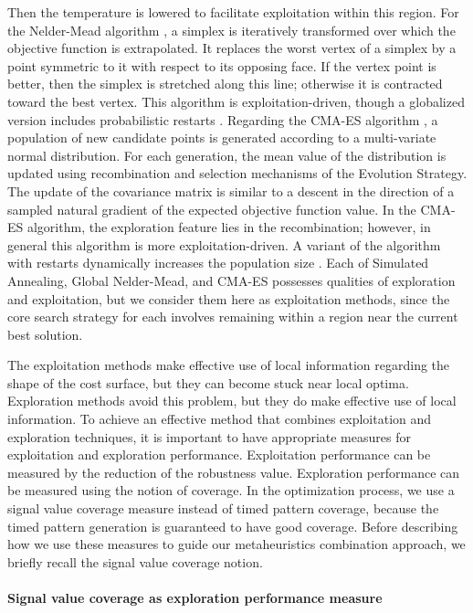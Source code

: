 Then the temperature is lowered to facilitate exploitation within this region. For the Nelder-Mead algorithm \cite{NelderMead65}, a simplex is iteratively transformed over which the objective function is extrapolated. It replaces the worst vertex of a simplex by a point symmetric to it with respect to its opposing face. If the vertex point is better, then the simplex is stretched along this line; otherwise it is contracted toward the best vertex. This algorithm is exploitation-driven, though a globalized version includes probabilistic restarts \cite{CHANG2012684}. Regarding the CMA-ES algorithm \cite{hansen2006eda}, a population of new candidate points is generated according to a multi-variate normal distribution. For each generation, the mean value of the distribution is updated using recombination and selection mechanisms of the Evolution Strategy. The update of the covariance matrix is similar to a descent in the direction of a sampled natural gradient of the expected objective function value. In the CMA-ES algorithm, the exploration feature lies in the recombination; however, in general this algorithm is more exploitation-driven. A variant of the algorithm with restarts dynamically increases the population size \cite{hansen2006eda}. Each of Simulated Annealing, Global Nelder-Mead, and CMA-ES possesses qualities of exploration and exploitation, but we consider them here as exploitation methods, since the core search strategy for each involves remaining within a region near the current best solution.

The exploitation methods make effective use of local information regarding the shape of the cost surface, but they can become stuck near local optima. Exploration methods avoid this problem, but they do make effective use of local information. To achieve an effective method that combines exploitation and exploration techniques, it is important to have appropriate measures for exploitation and exploration performance. Exploitation performance can be measured by the reduction of the robustness value. Exploration performance can be measured using the notion of coverage. In the optimization process, we use a signal value coverage measure instead of timed pattern coverage, because the timed pattern generation is guaranteed to have good coverage. Before describing how we use these measures to guide our metaheuristics combination approach, we briefly recall the signal value coverage notion.

\paragraph{Signal value coverage as exploration performance measure}	

